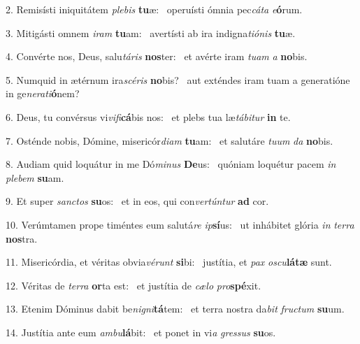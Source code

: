 2. Remisísti iniquitátem \textit{ple}\textit{bis} \textbf{tu}æ: \ast\  operuísti ómnia pec\textit{cá}\textit{ta} \textit{e}\textbf{ó}rum.\

3. Mitigásti omnem \textit{i}\textit{ram} \textbf{tu}am: \ast\  avertísti ab ira indigna\textit{ti}\textit{ó}\textit{nis} \textbf{tu}æ.\

4. Convérte nos, Deus, salu\textit{tá}\textit{ris} \textbf{nos}ter: \ast\  et avérte iram \textit{tu}\textit{am} \textit{a} \textbf{no}bis.\

5. Numquid in ætérnum ira\textit{scé}\textit{ris} \textbf{no}bis? \ast\  aut exténdes iram tuam a generatióne in ge\textit{ne}\textit{ra}\textit{ti}\textbf{ó}nem?\

6. Deus, tu convérsus vi\textit{vi}\textit{fi}\textbf{cá}bis nos: \ast\  et plebs tua læ\textit{tá}\textit{bi}\textit{tur} \textbf{in} te.\

7. Osténde nobis, Dómine, misericór\textit{di}\textit{am} \textbf{tu}am: \ast\  et salutáre \textit{tu}\textit{um} \textit{da} \textbf{no}bis.\

8. Audiam quid loquátur in me Dó\textit{mi}\textit{nus} \textbf{De}us: \ast\  quóniam loquétur pacem \textit{in} \textit{ple}\textit{bem} \textbf{su}am.\

9. Et super \textit{sanc}\textit{tos} \textbf{su}os: \ast\  et in eos, qui con\textit{ver}\textit{tún}\textit{tur} \textbf{ad} cor.\

10. Verúmtamen prope timéntes eum salutá\textit{re} \textit{ip}\textbf{sí}us: \ast\  ut inhábitet glória \textit{in} \textit{ter}\textit{ra} \textbf{nos}tra.\

11. Misericórdia, et véritas obvia\textit{vé}\textit{runt} \textbf{si}bi: \ast\  justítia, et \textit{pax} \textit{os}\textit{cu}\textbf{lá}\textbf{tæ} sunt.\

12. Véritas de \textit{ter}\textit{ra} \textbf{or}ta est: \ast\  et justítia de \textit{cæ}\textit{lo} \textit{pro}\textbf{spé}xit.\

13. Etenim Dóminus dabit be\textit{ni}\textit{gni}\textbf{tá}tem: \ast\  et terra nostra da\textit{bit} \textit{fruc}\textit{tum} \textbf{su}um.\

14. Justítia ante eum \textit{am}\textit{bu}\textbf{lá}bit: \ast\  et ponet in vi\textit{a} \textit{gres}\textit{sus} \textbf{su}os.\

